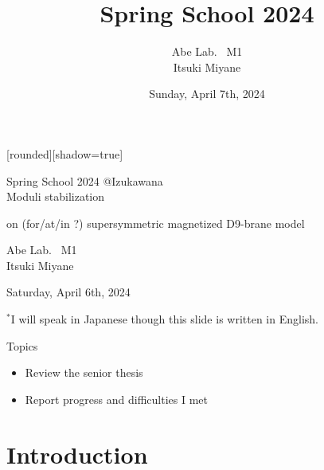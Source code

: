 \documentclass[
  unicode,a4paper,10pt,
  xcolor = {dvipsnames,svgnames},
  hyperref ={colorlinks=true,citecolor=Navy,linkcolor=NavyBlue,urlcolor=purple},
  ja=standard,lualatex
]{beamer}
\title{
  Spring School 2024
}
\author{
  Abe Lab. \ M1
  \texorpdfstring{\\}{}
  \texorpdfstring{\vspace*{3pt}}{}
  Itsuki Miyane
}
\date{Sunday, April 7th, 2024}
\begin{document}
\begin{frame}

  [rounded][shadow=true]

  \begin{block}{}
    \centering
    Spring School 2024 @Izukawana
    \\
    \Large
    Moduli stabilization

    on (for/at/in ?) supersymmetric magnetized D9-brane model
  \end{block}

  \begin{center}
    Abe Lab. \ M1 \\
    Itsuki Miyane

    \vspace*{5pt}

    Saturday, April 6th, 2024
  \end{center}

  \begin{center}
    $^{\ast}$I will speak in Japanese though this slide is written in English.
  \end{center}
\end{frame}

\begin{frame}{Topics}
  \begin{itemize}
    \item
          Review the senior thesis
    \item
          Report progress and difficulties I met
  \end{itemize}
\end{frame}


\section{Introduction}

\begin{frame}
  \huge \secname
\end{frame}
\end{document}
